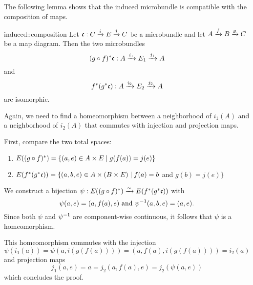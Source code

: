 \begin{myparagraph}
    The following lemma shows that the induced microbundle
    is compatible with the composition of maps.
\end{myparagraph}

\begin{mylemma}{induced::composition}{}
    Let $\bundledef{\bc}{C}{E}{i}{j}$ be a microbundle and let $A \xto{f} B \xto{g} C$ be a map diagram.
    Then the two microbundles
    \[ \bundledef{\ind{(g \circ f)}\bc}{A}{E_1}{i_1}{j_1} \]
    and
    \[ \bundledef{\ind{f}(\ind{g}\bc)}{A}{E_2}{i_2}{j_2} \]
    are isomorphic.
\end{mylemma}

\begin{myproof}
    Again, we need to find a homeomorphism between a neighborhood of $i_1(A)$ and a neighborhood of $i_2(A)$
    that commutes with injection and projection maps.
    
    First, compare the two total spaces:
    \begin{enumerate}
        \item $E(\ind{(g \circ f)}) = \{ (a, e) \in A \times E \mid g(f(a)) = j(e)\}$ 
        \item $E(\ind{f}(\ind{g}\bc)) = \{ (a, b, e) \in A \times (B \times E) \mid f(a) = b$ and $ g(b) = j(e) \}$
    \end{enumerate}
    We construct a bijection $\psi: E(\ind{(g \circ f)}) \isomto E(\ind{f}(\ind{g}\bc))$ with
    \[ \psi(a, e) = (a, f(a), e) \tand \inv{\psi}(a, b, e) = (a, e).\]
    Since both $\psi$ and $\inv{\psi}$ are component-wise continuous, it follows that $\psi$ is a homeomorphism.

    This homeomorphism commutes with the injection
    \[ \psi(i_1(a)) = \psi(a, i(g(f(a)))) = (a, f(a), i(g(f(a)))) = i_2(a) \]
    and projection maps
    \[ j_1(a, e) = a = j_2(a, f(a), e) = j_2(\psi(a, e)) \]
    which concludes the proof.
\end{myproof}